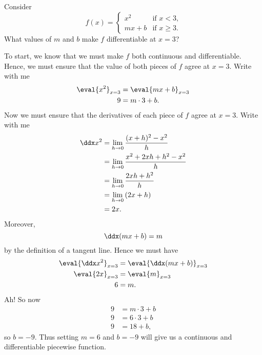 \documentclass{ximera}
\begin{document}
\begin{example}
  Consider
  \[
  f(x) = \begin{cases}
          x^2 &\text{if $x<3$,}\\
          mx+b &\text{if $x\ge 3$.}
         \end{cases}
  \]
  What values of $m$ and $b$ make $f$ differentiable at $x=3$?
  \begin{explanation}
    To start, we know that we must make $f$ both continuous and
    differentiable. Hence, we must ensure that the value of both
    pieces of $f$ agree at $x=3$. Write with me
    \begin{align*}
      \eval{x^2}_{x=3} &= \eval{mx+b}_{x=3}\\
      9 &= m\cdot 3 + b.
    \end{align*}
    Now we must ensure that the derivatives of each piece of $f$ agree
    at $x=3$. Write with me
    \begin{align*}
    \ddx x^2 &= \lim_{h\to 0}\frac{(x+h)^2-x^2}{h}\\
    &= \lim_{h\to 0}\frac{x^2 + 2xh + h^2 - x^2}{h}\\
    &= \lim_{h\to 0}\frac{2xh + h^2}{h}\\
    &= \lim_{h\to 0}\left(2x + h\right)\\
    &=2x.
    \end{align*}
    Moreover,
    \[
    \ddx(mx+ b) = m
    \]
    by the definition of a tangent line. Hence we must have
    \begin{align*}
      \eval{\ddx x^2}_{x=3} &= \eval{\ddx(mx+b)}_{x=3}\\
      \eval{2x}_{x=3} &= \eval{m}_{x=3}\\
      6 &= m.
    \end{align*}
    Ah! So now
    \begin{align*}
      9 &= m\cdot 3 + b\\
      9 &= 6\cdot 3 + b\\
      9 &= 18 + b,
    \end{align*}
    so $b=-9$. Thus setting $m=6$ and $b=-9$ will give us a continuous
    and differentiable piecewise function.
  \end{explanation}
\end{example}
\end{document}
